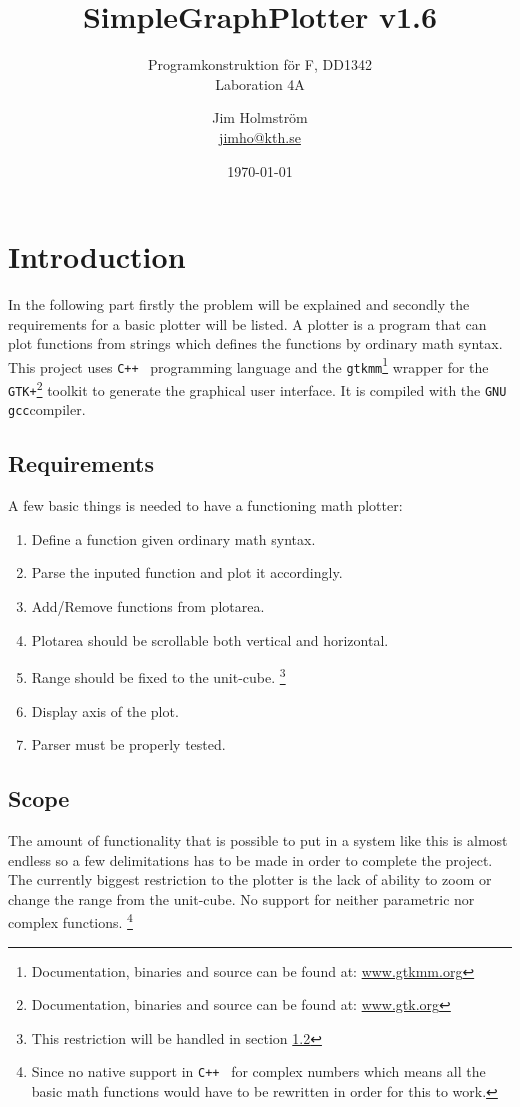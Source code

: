 \documentclass[a4paper,11pt]{kth-mag}
\title{SimpleGraphPlotter v1.6}
\subtitle{Programkonstruktion f\"{o}r F, DD1342\\ Laboration 4A}
\author{Jim Holmstr\"{o}m\\\href{mailto:jimho@kth.se}{jimho@kth.se}}
\date{\today}
\newcommand{\Cpp}{\texttt{C++}}
\newcommand{\Gcc}{\texttt{gcc}}
\newcommand{\Gtkmm}{\texttt{gtkmm}}
\newcommand{\Gtk}{\texttt{GTK+}}
\begin{document}
\frontmatter
\pagestyle{empty}
\removepagenumbers
\maketitle
{}
\tableofcontents*
\mainmatter
\pagestyle{newchap}

\chapter{Introduction}
In the following part firstly the problem will be explained and secondly 
the requirements for a basic plotter will be listed.
A plotter is a program that can plot functions from strings which defines the 
functions by ordinary math syntax. 
This project uses \Cpp~ programming language and the 
\Gtkmm\footnote{Documentation, binaries and source can be found at: 
\href{http://www.gtkmm.org}{www.gtkmm.org}} wrapper for the 
\Gtk\footnote{Documentation, binaries and source can be found at: 
\href{http://www.gtk.org}{www.gtk.org}} toolkit to generate the graphical user interface. 
It is compiled with the \texttt{GNU} \Gcc compiler.

\section{Requirements}
A few basic things is needed to have a functioning math plotter:
\begin{enumerate}
\item Define a function given ordinary math syntax.
\item Parse the inputed function and plot it accordingly.
\item Add/Remove functions from plotarea.
\item Plotarea should be scrollable both vertical and horizontal.
\item Range should be fixed to the unit-cube.
        \footnote{This restriction will be handled in section \ref{sec:scope}}
\item Display axis of the plot.
\item Parser must be properly tested.
\end{enumerate}

\section{Scope}
\label{sec:scope}
The amount of functionality that is possible to put in a system like this is
almost endless so a few delimitations has to be made in order to complete the project.
The currently biggest restriction to the plotter is the lack of 
ability to zoom or change the range from the unit-cube.
No support for neither parametric nor complex functions.
\footnote{
    Since no native support in \Cpp~ for complex numbers which means 
    all the basic math functions would have to be rewritten in order for this to work.
}
\end{document}
